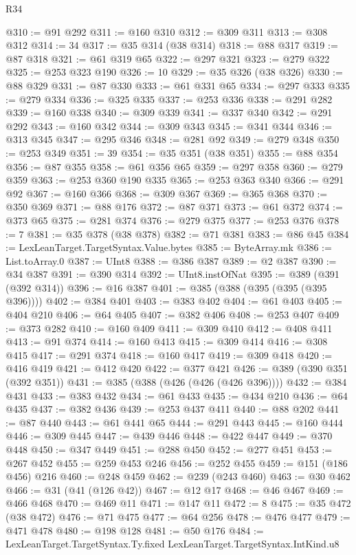\begin{lexlean}{R34}
\begin{coremodule}
@310 := @91 @292
@311 := @160 @310
@312 := @309 @311
@313 := @308 @312
@314 := 34
@317 := @35 @314 (@38 @314)
@318 := @88 @317
@319 := @87 @318
@321 := @61 @319 @65
@322 := @297 @321
@323 := @279 @322
@325 := @253 @323 @190
@326 := 10
@329 := @35 @326 (@38 @326)
@330 := @88 @329
@331 := @87 @330
@333 := @61 @331 @65
@334 := @297 @333
@335 := @279 @334
@336 := @325 @335
@337 := @253 @336
@338 := @291 @282
@339 := @160 @338
@340 := @309 @339
@341 := @337 @340
@342 := @291 @292
@343 := @160 @342
@344 := @309 @343
@345 := @341 @344
@346 := @313 @345
@347 := @295 @346
@348 := @281 @92
@349 := @279 @348
@350 := @253 @349
@351 := 39
@354 := @35 @351 (@38 @351)
@355 := @88 @354
@356 := @87 @355
@358 := @61 @356 @65
@359 := @297 @358
@360 := @279 @359
@363 := @253 @360 @190 @335
@365 := @253 @363 @340
@366 := @291 @92
@367 := @160 @366
@368 := @309 @367
@369 := @365 @368
@370 := @350 @369
@371 := @88 @176
@372 := @87 @371
@373 := @61 @372
@374 := @373 @65
@375 := @281 @374
@376 := @279 @375
@377 := @253 @376
@378 := 7
@381 := @35 @378 (@38 @378)
@382 := @71 @381
@383 := @86 @45
@384 := LexLeanTarget.TargetSyntax.Value.bytes
@385 := ByteArray.mk
@386 := List.toArray.{0}
@387 := UInt8
@388 := @386 @387
@389 := @2 @387
@390 := @34 @387
@391 := @390 @314
@392 := UInt8.instOfNat
@395 := @389 (@391 (@392 @314))
@396 := @16 @387
@401 := @385 (@388 (@395 (@395 (@395 @396))))
@402 := @384 @401
@403 := @383 @402
@404 := @61 @403
@405 := @404 @210
@406 := @64 @405
@407 := @382 @406
@408 := @253 @407
@409 := @373 @282
@410 := @160 @409
@411 := @309 @410
@412 := @408 @411
@413 := @91 @374
@414 := @160 @413
@415 := @309 @414
@416 := @308 @415
@417 := @291 @374
@418 := @160 @417
@419 := @309 @418
@420 := @416 @419
@421 := @412 @420
@422 := @377 @421
@426 := @389 (@390 @351 (@392 @351))
@431 := @385 (@388 (@426 (@426 (@426 @396))))
@432 := @384 @431
@433 := @383 @432
@434 := @61 @433
@435 := @434 @210
@436 := @64 @435
@437 := @382 @436
@439 := @253 @437 @411
@440 := @88 @202
@441 := @87 @440
@443 := @61 @441 @65
@444 := @291 @443
@445 := @160 @444
@446 := @309 @445
@447 := @439 @446
@448 := @422 @447
@449 := @370 @448
@450 := @347 @449
@451 := @288 @450
@452 := @277 @451
@453 := @267 @452
@455 := @259 @453 @246
@456 := @252 @455
@459 := @151 (@186 @456) @216
@460 := @248 @459
@462 := @239 (@243 @460)
@463 := @30 @462
@466 := @31 (@41 (@126 @42))
@467 := @12 @17
@468 := @46 @467
@469 := @466 @468
@470 := @469 @11
@471 := @147 @11
@472 := 8
@475 := @35 @472 (@38 @472)
@476 := @71 @475
@477 := @64 @256
@478 := @476 @477
@479 := @471 @478
@480 := @198 @128
@481 := @50 @176
@484 := LexLeanTarget.TargetSyntax.Ty.fixed LexLeanTarget.TargetSyntax.IntKind.u8

\end{coremodule}
\end{lexlean}
